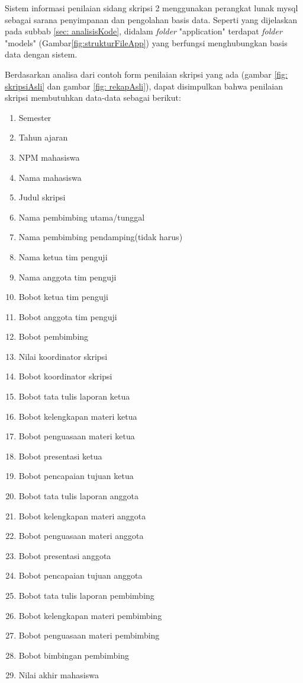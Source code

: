 	Sistem informasi penilaian sidang skripsi 2 menggunakan perangkat lunak mysql sebagai sarana penyimpanan dan pengolahan basis data. Seperti yang dijelaskan pada subbab \ref{sec: analisisKode}, didalam \textit{folder} "application" terdapat \textit{folder} "models" (Gambar\ref{fig:strukturFileApp}) yang berfungsi menghubungkan basis data dengan sistem. 
	
	Berdasarkan analisa dari contoh form penilaian skripsi yang ada (gambar \ref{fig: skripsiAsli} dan gambar \ref{fig: rekapAsli}), dapat disimpulkan bahwa penilaian skripsi membutuhkan data-data sebagai berikut:
		
		\begin{enumerate}
			\item Semester
			\item Tahun ajaran
			\item NPM mahasiswa 
			\item Nama mahasiswa
			\item Judul skripsi
			\item Nama pembimbing utama/tunggal
			\item Nama pembimbing pendamping(tidak harus)
			\item Nama ketua tim penguji
			\item Nama anggota tim penguji
			\item Bobot ketua tim penguji
			\item Bobot anggota tim penguji
			\item Bobot pembimbing
			\item Nilai koordinator skripsi
			\item Bobot koordinator skripsi
			\item Bobot tata tulis laporan ketua
			\item Bobot kelengkapan materi ketua
			\item Bobot penguasaan materi ketua
			\item Bobot presentasi ketua
			\item Bobot pencapaian tujuan ketua
			\item Bobot tata tulis laporan anggota
			\item Bobot kelengkapan materi anggota
			\item Bobot penguasaan materi anggota
			\item Bobot presentasi anggota
			\item Bobot pencapaian tujuan anggota
			\item Bobot tata tulis laporan pembimbing
			\item Bobot kelengkapan materi pembimbing
			\item Bobot penguasaan materi pembimbing
			\item Bobot bimbingan pembimbing
			\item Nilai akhir mahasiswa
		\end{enumerate}
	
